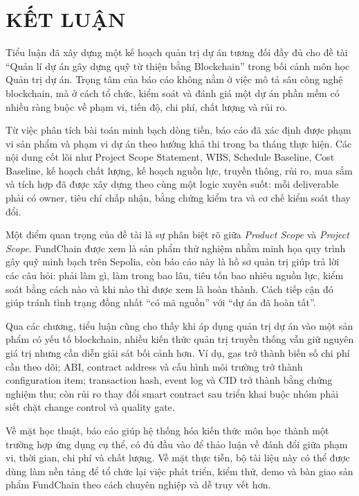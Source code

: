 \chapter*{KẾT LUẬN}

Tiểu luận đã xây dựng một kế hoạch quản trị dự án tương đối đầy đủ cho đề tài ``Quản lí dự án gây dựng quỹ từ thiện bằng Blockchain'' trong bối cảnh môn học Quản trị dự án. Trọng tâm của báo cáo không nằm ở việc mô tả sâu công nghệ blockchain, mà ở cách tổ chức, kiểm soát và đánh giá một dự án phần mềm có nhiều ràng buộc về phạm vi, tiến độ, chi phí, chất lượng và rủi ro.

Từ việc phân tích bài toán minh bạch dòng tiền, báo cáo đã xác định được phạm vi sản phẩm và phạm vi dự án theo hướng khả thi trong ba tháng thực hiện. Các nội dung cốt lõi như Project Scope Statement, WBS, Schedule Baseline, Cost Baseline, kế hoạch chất lượng, kế hoạch nguồn lực, truyền thông, rủi ro, mua sắm và tích hợp đã được xây dựng theo cùng một logic xuyên suốt: mỗi deliverable phải có owner, tiêu chí chấp nhận, bằng chứng kiểm tra và cơ chế kiểm soát thay đổi.

Một điểm quan trọng của đề tài là sự phân biệt rõ giữa \textit{Product Scope} và \textit{Project Scope}. FundChain được xem là sản phẩm thử nghiệm nhằm minh họa quy trình gây quỹ minh bạch trên Sepolia, còn báo cáo này là hồ sơ quản trị giúp trả lời các câu hỏi: phải làm gì, làm trong bao lâu, tiêu tốn bao nhiêu nguồn lực, kiểm soát bằng cách nào và khi nào thì được xem là hoàn thành. Cách tiếp cận đó giúp tránh tình trạng đồng nhất ``có mã nguồn'' với ``dự án đã hoàn tất''.

Qua các chương, tiểu luận cũng cho thấy khi áp dụng quản trị dự án vào một sản phẩm có yếu tố blockchain, nhiều kiến thức quản trị truyền thống vẫn giữ nguyên giá trị nhưng cần diễn giải sát bối cảnh hơn. Ví dụ, gas trở thành biến số chi phí cần theo dõi; ABI, contract address và cấu hình môi trường trở thành configuration item; transaction hash, event log và CID trở thành bằng chứng nghiệm thu; còn rủi ro thay đổi smart contract sau triển khai buộc nhóm phải siết chặt change control và quality gate.

Về mặt học thuật, báo cáo giúp hệ thống hóa kiến thức môn học thành một trường hợp ứng dụng cụ thể, có đủ đầu vào để thảo luận về đánh đổi giữa phạm vi, thời gian, chi phí và chất lượng. Về mặt thực tiễn, bộ tài liệu này có thể được dùng làm nền tảng để tổ chức lại việc phát triển, kiểm thử, demo và bàn giao sản phẩm FundChain theo cách chuyên nghiệp và dễ truy vết hơn.

